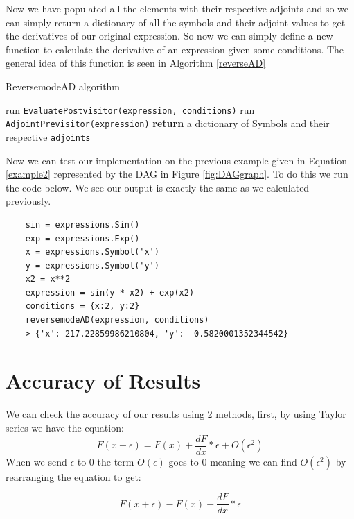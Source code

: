 \documentclass{article}
\begin{document}
Now we have populated all the elements with their respective adjoints and so we can simply return a dictionary of all the symbols and their adjoint values to get the derivatives of our original expression. So now we can simply define a new function to calculate the derivative of an expression given some conditions. The general idea of this function is seen in Algorithm \ref{reverseAD}

\begin{algorithm}[h]
\caption{ReversemodeAD algorithm}\label{reverseAD}
\begin{algorithmic}[1]
\State run \verb|EvaluatePostvisitor(expression, conditions)|
\State run \verb|AdjointPrevisitor(expression)|
\State \textbf{return} a dictionary of Symbols and their respective \verb|adjoints|
\EndProcedure
\end{algorithmic}
\end{algorithm}

Now we can test our implementation on the previous example given in Equation \ref{example2} represented by the DAG in Figure \ref{fig:DAGgraph}. To do this we run the code below. We see our output is exactly the same as we calculated previously.

\begin{verbatim}
    sin = expressions.Sin()
    exp = expressions.Exp()
    x = expressions.Symbol('x')
    y = expressions.Symbol('y')
    x2 = x**2
    expression = sin(y * x2) + exp(x2)
    conditions = {x:2, y:2}
    reversemodeAD(expression, conditions)
    > {'x': 217.22859986210804, 'y': -0.5820001352344542}
\end{verbatim}



\section{Accuracy of Results}

We can check the accuracy of our results using 2 methods, first, by using Taylor series we have the equation:
\begin{equation}
    F(x + \epsilon) = F(x) + \frac{dF}{dx} * \epsilon + O(\epsilon ^ 2)
\end{equation}
When we send $\epsilon$ to 0 the term $O(\epsilon)$ goes to 0 meaning we can find $O(\epsilon^2)$ by rearranging the equation to get:

\begin{equation}
    F(x + \epsilon) - F(x) - \frac{dF}{dx} * \epsilon
\end{equation}
\end{document}
